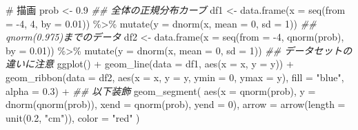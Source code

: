 \documentclass[
  a4paper,
]{ltjsbook}
\newenvironment{Shaded}{\begin{snugshade}}{\end{snugshade}}
\newcommand{\AttributeTok}[1]{\textcolor[rgb]{0.40,0.45,0.13}{#1}}
\newcommand{\CommentTok}[1]{\textcolor[rgb]{0.37,0.37,0.37}{#1}}
\newcommand{\DecValTok}[1]{\textcolor[rgb]{0.68,0.00,0.00}{#1}}
\newcommand{\DocumentationTok}[1]{\textcolor[rgb]{0.37,0.37,0.37}{\textit{#1}}}
\newcommand{\FloatTok}[1]{\textcolor[rgb]{0.68,0.00,0.00}{#1}}
\newcommand{\FunctionTok}[1]{\textcolor[rgb]{0.28,0.35,0.67}{#1}}
\newcommand{\NormalTok}[1]{\textcolor[rgb]{0.00,0.23,0.31}{#1}}
\newcommand{\OtherTok}[1]{\textcolor[rgb]{0.00,0.23,0.31}{#1}}
\newcommand{\SpecialCharTok}[1]{\textcolor[rgb]{0.37,0.37,0.37}{#1}}
\newcommand{\StringTok}[1]{\textcolor[rgb]{0.13,0.47,0.30}{#1}}
\begin{document}
\begin{Shaded}
\begin{Highlighting}[]
\CommentTok{\# 描画}
\NormalTok{prob }\OtherTok{\textless{}{-}} \FloatTok{0.9}
\DocumentationTok{\#\# 全体の正規分布カーブ}
\NormalTok{df1 }\OtherTok{\textless{}{-}} \FunctionTok{data.frame}\NormalTok{(}\AttributeTok{x =} \FunctionTok{seq}\NormalTok{(}\AttributeTok{from =} \SpecialCharTok{{-}}\DecValTok{4}\NormalTok{, }\DecValTok{4}\NormalTok{, }\AttributeTok{by =} \FloatTok{0.01}\NormalTok{)) }\SpecialCharTok{\%\textgreater{}\%}
  \FunctionTok{mutate}\NormalTok{(}\AttributeTok{y =} \FunctionTok{dnorm}\NormalTok{(x, }\AttributeTok{mean =} \DecValTok{0}\NormalTok{, }\AttributeTok{sd =} \DecValTok{1}\NormalTok{))}
\DocumentationTok{\#\# qnorm(0.975)までのデータ}
\NormalTok{df2 }\OtherTok{\textless{}{-}} \FunctionTok{data.frame}\NormalTok{(}\AttributeTok{x =} \FunctionTok{seq}\NormalTok{(}\AttributeTok{from =} \SpecialCharTok{{-}}\DecValTok{4}\NormalTok{, }\FunctionTok{qnorm}\NormalTok{(prob), }\AttributeTok{by =} \FloatTok{0.01}\NormalTok{)) }\SpecialCharTok{\%\textgreater{}\%}
  \FunctionTok{mutate}\NormalTok{(}\AttributeTok{y =} \FunctionTok{dnorm}\NormalTok{(x, }\AttributeTok{mean =} \DecValTok{0}\NormalTok{, }\AttributeTok{sd =} \DecValTok{1}\NormalTok{))}
\DocumentationTok{\#\# データセットの違いに注意}
\FunctionTok{ggplot}\NormalTok{() }\SpecialCharTok{+}
  \FunctionTok{geom\_line}\NormalTok{(}\AttributeTok{data =}\NormalTok{ df1, }\FunctionTok{aes}\NormalTok{(}\AttributeTok{x =}\NormalTok{ x, }\AttributeTok{y =}\NormalTok{ y)) }\SpecialCharTok{+}
  \FunctionTok{geom\_ribbon}\NormalTok{(}\AttributeTok{data =}\NormalTok{ df2, }\FunctionTok{aes}\NormalTok{(}\AttributeTok{x =}\NormalTok{ x, }\AttributeTok{y =}\NormalTok{ y, }\AttributeTok{ymin =} \DecValTok{0}\NormalTok{, }\AttributeTok{ymax =}\NormalTok{ y), }\AttributeTok{fill =} \StringTok{"blue"}\NormalTok{, }\AttributeTok{alpha =} \FloatTok{0.3}\NormalTok{) }\SpecialCharTok{+}
  \DocumentationTok{\#\# 以下装飾}
  \FunctionTok{geom\_segment}\NormalTok{(}
    \FunctionTok{aes}\NormalTok{(}\AttributeTok{x =} \FunctionTok{qnorm}\NormalTok{(prob), }\AttributeTok{y =} \FunctionTok{dnorm}\NormalTok{(}\FunctionTok{qnorm}\NormalTok{(prob)), }\AttributeTok{xend =} \FunctionTok{qnorm}\NormalTok{(prob), }\AttributeTok{yend =} \DecValTok{0}\NormalTok{),}
    \AttributeTok{arrow =} \FunctionTok{arrow}\NormalTok{(}\AttributeTok{length =} \FunctionTok{unit}\NormalTok{(}\FloatTok{0.2}\NormalTok{, }\StringTok{"cm"}\NormalTok{)), }\AttributeTok{color =} \StringTok{"red"}
\NormalTok{  )}
\end{Highlighting}
\end{Shaded}
\end{document}
